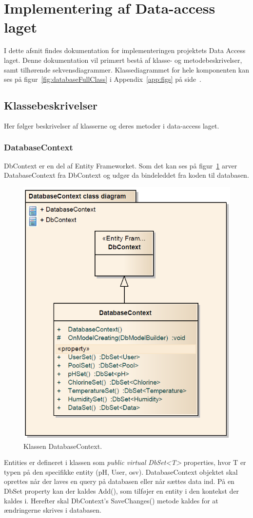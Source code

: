 \section{Implementering af Data-access laget}
I dette afsnit findes dokumentation for implementeringen projektets Data Access laget. Denne dokumentation vil primært bestå af klasse- og metodebeskrivelser, samt tilhørende sekvensdiagrammer. Klassediagrammet for hele komponenten kan ses på figur~\ref{fig:databaseFullClass} i Appendix~\ref{app:figs} på side~\pageref{fig:databaseFullClass}.

\subsection{Klassebeskrivelser}
Her følger beskrivelser af klasserne og deres metoder i data-access laget.

\subsubsection{DatabaseContext}
DbContext er en del af Entity Frameworket. Som det kan ses på figur~\ref{fig:dbContextClass} arver DatabaseContext fra DbContext \cite{microsoftdbcontext} og udgør da bindeleddet fra koden til databasen.

\begin{figure}[h]
\centering
\includegraphics[width=0.5\linewidth]{figs/implementering/dbContextClass.PNG}
\caption{Klassen DatabaseContext.}
\label{fig:dbContextClass}
\end{figure}

Entities er defineret i klassen som \textit{public virtual DbSet<T>} properties, hvor T er typen på den specifikke entity (pH, User, osv).
DatabaseContext objektet skal oprettes når der laves en query på databasen eller når sættes data ind.
På en DbSet property kan der kaldes Add(), som tilføjer en entity i den kontekst der kaldes i. Herefter skal DbContext’s SaveChanges() metode kaldes for at ændringerne skrives i databasen.

